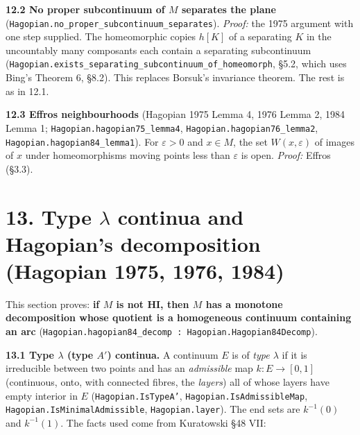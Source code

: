 \documentclass[11pt]{article}
\newcommand{\lean}[1]{\texttt{#1}}
\begin{document}
\textbf{12.2 No proper subcontinuum of $M$ separates the plane} (\lean{Hagopian.\hspace{0pt}no\_\hspace{0pt}proper\_\hspace{0pt}subcontinuum\_\hspace{0pt}separates}). \emph{Proof:} the 1975 argument with one step supplied. The homeomorphic copies $h[K]$ of a separating $K$ in the uncountably many composants each contain a separating subcontinuum (\lean{Hagopian.\hspace{0pt}exists\_\hspace{0pt}separating\_\hspace{0pt}subcontinuum\_\hspace{0pt}of\_\hspace{0pt}homeomorph}, \S{}5.2, which uses Bing's Theorem 6, \S{}8.2). This replaces Borsuk's invariance theorem. The rest is as in 12.1.

\textbf{12.3 Effros neighbourhoods} (Hagopian 1975 Lemma 4, 1976 Lemma 2, 1984 Lemma 1; \lean{Hagopian.\hspace{0pt}hagopian75\_\hspace{0pt}lemma4}, \lean{Hagopian.\hspace{0pt}hagopian76\_\hspace{0pt}lemma2}, \lean{Hagopian.\hspace{0pt}hagopian84\_\hspace{0pt}lemma1}). For $\varepsilon > 0$ and $x \in M$, the set $W(x, \varepsilon)$ of images of $x$ under homeomorphisms moving points less than $\varepsilon$ is open. \emph{Proof:} Effros (\S{}3.3).

\section*{13. Type $\lambda$ continua and Hagopian's decomposition (Hagopian 1975, 1976, 1984)}

This section proves: \textbf{if $M$ is not HI, then $M$ has a monotone decomposition whose quotient is a homogeneous continuum containing an arc} (\lean{Hagopian.\hspace{0pt}hagopian84\_\hspace{0pt}decomp : Hagopian.\hspace{0pt}Hagopian84Decomp}).

\textbf{13.1 Type $\lambda$ (type $A'$) continua.} A continuum $E$ is of \emph{type $\lambda$} if it is irreducible between two points and has an \emph{admissible} map $k : E \to [0, 1]$ (continuous, onto, with connected fibres, the \emph{layers}) all of whose layers have empty interior in $E$ (\lean{Hagopian.\hspace{0pt}IsTypeA'}, \lean{Hagopian.\hspace{0pt}IsAdmissibleMap}, \lean{Hagopian.\hspace{0pt}IsMinimalAdmissible}, \lean{Hagopian.\hspace{0pt}layer}). The end sets are $k^{-1}(0)$ and $k^{-1}(1)$. The facts used come from Kuratowski \S{}48 VII:
\end{document}
